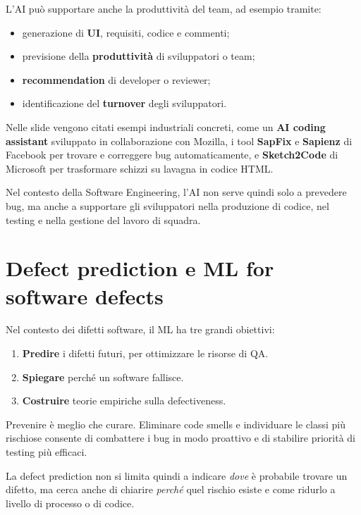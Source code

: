 L'AI può supportare anche la produttività del team, ad esempio tramite:
\begin{itemize}
    \item generazione di \textbf{UI}, requisiti, codice e commenti;
    \item previsione della \textbf{produttività} di sviluppatori o team;
    \item \textbf{recommendation} di developer o reviewer;
    \item identificazione del \textbf{turnover} degli sviluppatori.
\end{itemize}

\begin{notaslide}
Nelle slide vengono citati esempi industriali concreti, come un \textbf{AI coding assistant} sviluppato in collaborazione con Mozilla, i tool \textbf{SapFix} e \textbf{Sapienz} di Facebook per trovare e correggere bug automaticamente, e \textbf{Sketch2Code} di Microsoft per trasformare schizzi su lavagna in codice HTML.
\end{notaslide}

Nel contesto della Software Engineering, l'AI non serve quindi solo a prevedere bug, ma anche a supportare gli sviluppatori nella produzione di codice, nel testing e nella gestione del lavoro di squadra.

\section{Defect prediction e ML for software defects}

Nel contesto dei difetti software, il ML ha tre grandi obiettivi:
\begin{enumerate}
    \item \textbf{Predire} i difetti futuri, per ottimizzare le risorse di QA.
    \item \textbf{Spiegare} perché un software fallisce.
    \item \textbf{Costruire} teorie empiriche sulla defectiveness.
\end{enumerate}

\begin{notaprof}
Prevenire è meglio che curare. Eliminare code smells e individuare le classi più rischiose consente di combattere i bug in modo proattivo e di stabilire priorità di testing più efficaci.
\end{notaprof}

La defect prediction non si limita quindi a indicare \emph{dove} è probabile trovare un difetto, ma cerca anche di chiarire \emph{perché} quel rischio esiste e come ridurlo a livello di processo o di codice.

